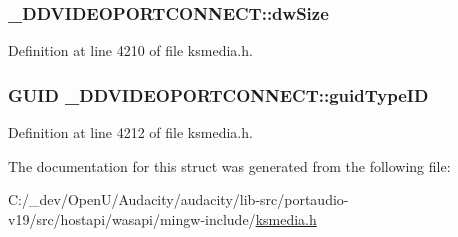 \subsubsection[{\texorpdfstring{dw\+Size}{dwSize}}]{ \+\_\+\+D\+D\+V\+I\+D\+E\+O\+P\+O\+R\+T\+C\+O\+N\+N\+E\+C\+T\+::dw\+Size}\hypertarget{struct___d_d_v_i_d_e_o_p_o_r_t_c_o_n_n_e_c_t_aa971e4d7fb8cb2fea4aeb6504da13e77}{}\label{struct___d_d_v_i_d_e_o_p_o_r_t_c_o_n_n_e_c_t_aa971e4d7fb8cb2fea4aeb6504da13e77}


Definition at line 4210 of file ksmedia.\+h.

\subsubsection[{\texorpdfstring{guid\+Type\+ID}{guidTypeID}}]{\setlength{\rightskip}{0pt plus 5cm}G\+U\+ID \+\_\+\+D\+D\+V\+I\+D\+E\+O\+P\+O\+R\+T\+C\+O\+N\+N\+E\+C\+T\+::guid\+Type\+ID}\hypertarget{struct___d_d_v_i_d_e_o_p_o_r_t_c_o_n_n_e_c_t_aac0f8ec595f52384aaadca7b7a676fbb}{}\label{struct___d_d_v_i_d_e_o_p_o_r_t_c_o_n_n_e_c_t_aac0f8ec595f52384aaadca7b7a676fbb}


Definition at line 4212 of file ksmedia.\+h.



The documentation for this struct was generated from the following file\+:\begin{DoxyCompactItemize}
\item 
C\+:/\+\_\+dev/\+Open\+U/\+Audacity/audacity/lib-\/src/portaudio-\/v19/src/hostapi/wasapi/mingw-\/include/\hyperlink{ksmedia_8h}{ksmedia.\+h}\end{DoxyCompactItemize}
